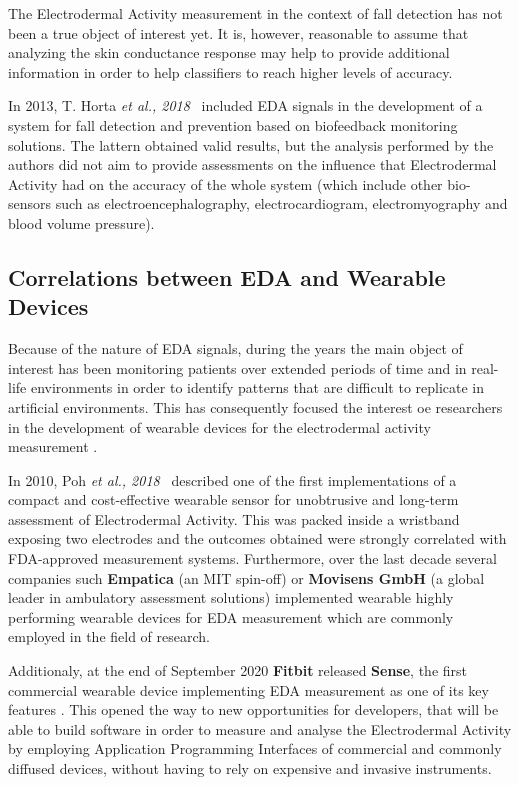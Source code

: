 The Electrodermal Activity measurement in the context of fall detection has not been a true object of interest yet. It is, however, reasonable to assume that analyzing the skin conductance response may help to provide additional information in order to help classifiers to reach higher levels of accuracy. 

In 2013, T. Horta \textit{et al., 2018}~\cite{eda-fall-detection} included EDA signals in the development of a system for fall detection and prevention based on biofeedback monitoring solutions. The lattern obtained valid results, but the analysis performed by the authors did not aim to provide assessments on the influence that Electrodermal Activity had on the accuracy of the whole system (which include other bio-sensors such as electroencephalography, electrocardiogram, electromyography and blood volume pressure).

\subsection{Correlations between EDA and Wearable Devices}\label{subsec:eda-wearables}

Because of the nature of EDA signals, during the years the main object of interest has been monitoring patients over extended periods of time and in real-life environments in order to identify patterns that are difficult to replicate in artificial environments. This has consequently focused the interest oe researchers in the development of wearable devices for the electrodermal activity measurement \cite{poh-wearable}. 

In 2010, Poh \textit{et al., 2018}~\cite{poh-wearable} described one of the first implementations of a compact and cost-effective wearable sensor for unobtrusive and long-term assessment of Electrodermal Activity. This was packed inside a wristband exposing two electrodes and the outcomes obtained were strongly correlated with FDA-approved measurement systems. Furthermore, over the last decade several companies such \textbf{Empatica} (an MIT spin-off) or \textbf{Movisens GmbH} (a global leader in ambulatory assessment solutions) implemented wearable highly performing wearable devices for EDA measurement which are commonly employed in the field of research.

Additionaly, at the end of September 2020 \textbf{Fitbit} released \textbf{Sense}, the first commercial wearable device implementing EDA measurement as one of its key features \cite{fitbit-eda}. This opened the way to new opportunities for developers, that will be able to build software in order to measure and analyse the Electrodermal Activity by employing Application Programming Interfaces of commercial and commonly diffused devices, without having to rely on expensive and invasive instruments.



